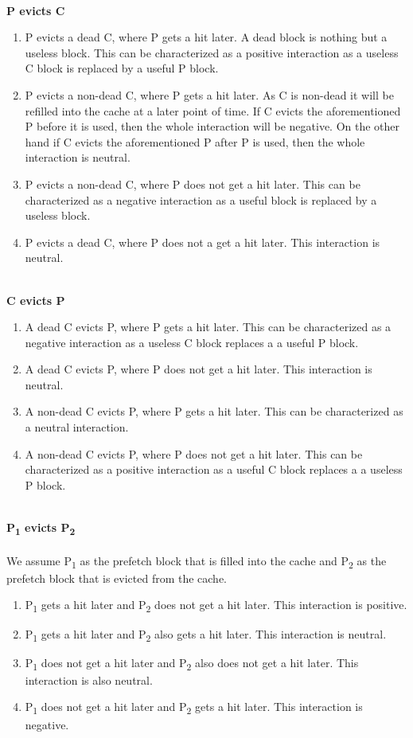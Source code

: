 \\\textbf{P evicts C}
\begin{enumerate}
    \item P evicts a dead C, where P gets a hit later. A dead block is nothing but a useless block. This can be characterized as a positive interaction as a useless C block is replaced by a useful P block.
    \item P evicts a non-dead C, where P gets a hit later. As C is non-dead it will be refilled into the cache at a later point of time. If C evicts the aforementioned P before it is used, then the whole interaction will be negative. On the other hand if C evicts the aforementioned P after P is used, then the whole interaction is neutral.
    \item P evicts a non-dead C, where P does not get a hit later. This can be characterized as a negative interaction as a useful block is replaced by a useless block.
    \item P evicts a dead C, where P does not a get a hit later. This interaction is neutral.
\end{enumerate}
\\
\textbf{C evicts P}
\begin{enumerate}
    \item A dead C evicts P, where P gets a hit later. This can be characterized as a negative interaction as a useless C block replaces a a useful P block.
    \item A dead C evicts P, where P does not get a hit later. This interaction is neutral.
    \item A non-dead C evicts P, where P gets a hit later. This can be characterized as a neutral interaction.
    \item A non-dead C evicts P, where P does not get a hit later. This can be characterized as a positive interaction as a useful C block replaces a a useless P block.
\end{enumerate}
\\
\textbf{P\textsubscript{1} evicts P\textsubscript{2}}
\\\\We assume P\textsubscript{1} as the prefetch block that is filled into the cache and P\textsubscript{2} as the prefetch block that is evicted from the cache.
\begin{enumerate}
    \item P\textsubscript{1} gets a hit later and P\textsubscript{2} does not get a hit later. This interaction is positive.
    \item P\textsubscript{1} gets a hit later and P\textsubscript{2} also gets a hit later. This interaction is neutral.
    \item P\textsubscript{1} does not get a hit later and P\textsubscript{2} also does not get a hit later. This interaction is also neutral.
    \item P\textsubscript{1} does not get a hit later and P\textsubscript{2} gets a hit later. This interaction is negative.
    
\end{enumerate}

